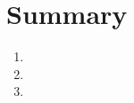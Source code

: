 

\section{Summary}

\lipsum[1]

\begin{enumerate}
    \item \lipsum[1]
    
    \item \lipsum[1]
    
    \item \lipsum[1]
    
\end{enumerate}

